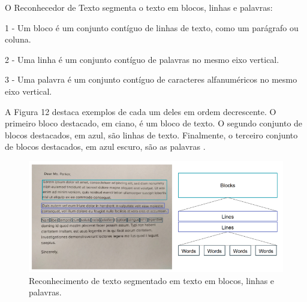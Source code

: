 O Reconhecedor de Texto segmenta o texto em blocos, linhas e palavras:

1 - Um bloco é um conjunto contíguo de linhas de texto, como um parágrafo ou coluna.

2 - Uma linha é um conjunto contíguo de palavras no mesmo eixo vertical.

3 - Uma palavra é um conjunto contíguo de caracteres alfanuméricos no mesmo eixo vertical.

A Figura 12 destaca exemplos de cada um deles em ordem decrescente. O primeiro bloco destacado, em ciano, é um bloco de texto. O segundo conjunto de blocos destacados, em azul, são linhas de texto. Finalmente, o terceiro conjunto de blocos destacados, em azul escuro, são as palavras \cite{MOBILEVISION}.

 \begin{figure}[h]
	\centering
	
	\includegraphics[width=1.0\textwidth]{Imagens/estruturatexto} 
	\caption[Reconhecimento de texto segmentado em texto em blocos, linhas e palavras.]{Reconhecimento de texto segmentado em texto em blocos, linhas e palavras.}
	\label{fig:tux_laplace}
\end{figure}
